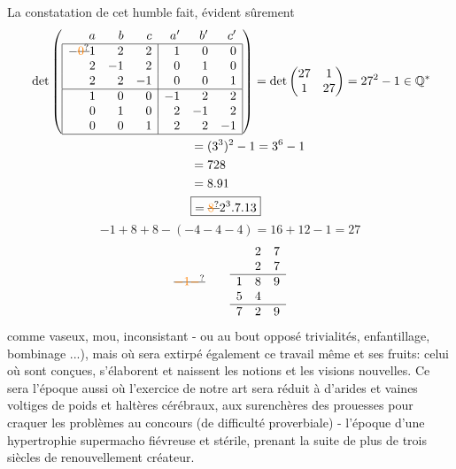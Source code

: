  La constatation de cet humble fait,  évident sûrement
\[
\begin{aligned}
&\det\left(
\begin{array}{|rrr|rrr|}
\multicolumn{1}{r}{a}&b&\multicolumn{1}{r}{c}&a'&b'&\multicolumn{1}{r}{c'}\\ \hline
-\deleted{\unsure{0}}1&2&2&1&0&0\\
2&-1&2&0&1&0\\
2&2&-1&0&0&1\\ \hline
1&0&0&-1&2&2\\
0&1&0&2&-1&2\\
0&0&1&2&2&-1\\ \hline
\end{array}\right)
=\det\begin{pmatrix}27&1\\1&27\end{pmatrix}=27^2-1\in\mathbb{Q}^{*}\\
&\hspace{13em}=(3^3)^2-1=3^6-1\\
&\hspace{13em}=728\\
&\hspace{13em}=8.91\\
&\hspace{13em}\boxed{=\deleted{\unsure{8}}2^3.7.13}
\end{aligned}
\]
\[
-1+8+8-(-4-4-4)=16+12-1=27
\]
\[
\deleted{\unsure{-1-}}\qquad
\begin{array}{rrr}
&2&7\\&2&7\\\hline
1&8&9\\5&4&\\\hline
7&2&9
\end{array}
\]
 comme vaseux, mou, inconsistant - ou au bout opposé  trivialités, enfantillage, bombinage ...), mais où sera extirpé également ce travail même et ses fruits: celui où sont conçues, s'élaborent et naissent les notions et les visions nouvelles. Ce sera l'époque aussi où l'exercice de notre art sera réduit à d'arides et vaines voltiges de poids et haltères cérébraux, aux surenchères des prouesses pour craquer les problèmes au concours (de difficulté proverbiale) - l'époque d'une hypertrophie supermacho fiévreuse et stérile, prenant la suite de plus de trois siècles de renouvellement créateur.

